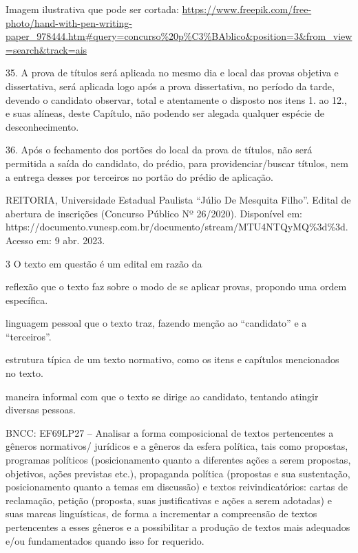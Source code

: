 \begin{escolha}
\begin{escolha}
\begin{escolha}
\begin{escolha}
\begin{escolha}
Imagem ilustrativa que pode ser cortada:
\url{https://www.freepik.com/free-photo/hand-with-pen-writing-paper_978444.htm\#query=concurso\%20p\%C3\%BAblico\&position=3\&from_view=search\&track=ais}

35. A prova de títulos será aplicada no mesmo dia e local das provas
objetiva e dissertativa, será aplicada logo após a prova dissertativa,
no período da tarde, devendo o candidato observar, total e atentamente o
disposto nos itens 1. ao 12., e suas alíneas, deste Capítulo, não
podendo ser alegada qualquer espécie de desconhecimento.

36. Após o fechamento dos portões do local da prova de títulos, não será
permitida a saída do candidato, do prédio, para providenciar/buscar
títulos, nem a entrega desses por terceiros no portão do prédio de
aplicação.

REITORIA, Universidade Estadual Paulista ``Júlio De Mesquita Filho''.
Edital de abertura de inscrições (Concurso Público Nº 26/2020).
Disponível em:
https://documento.vunesp.com.br/documento/stream/MTU4NTQyMQ\%3d\%3d.
Acesso em: 9 abr. 2023.

\num{3} O texto em questão é um edital em razão da

\begin{escolha}
\item reflexão que o texto faz sobre o modo de se aplicar provas, propondo
uma ordem específica.

\item linguagem pessoal que o texto traz, fazendo menção ao ``candidato''
e a ``terceiros''.

\item estrutura típica de um texto normativo, como os itens e capítulos
mencionados no texto.

\item maneira informal com que o texto se dirige ao candidato, tentando
atingir diversas pessoas.
\end{escolha}

BNCC: EF69LP27 -- Analisar a forma composicional de textos pertencentes
a gêneros normativos/ jurídicos e a gêneros da esfera política, tais
como propostas, programas políticos (posicionamento quanto a diferentes
ações a serem propostas, objetivos, ações previstas etc.), propaganda
política (propostas e sua sustentação, posicionamento quanto a temas em
discussão) e textos reivindicatórios: cartas de reclamação, petição
(proposta, suas justificativas e ações a serem adotadas) e suas marcas
linguísticas, de forma a incrementar a compreensão de textos
pertencentes a esses gêneros e a possibilitar a produção de textos mais
adequados e/ou fundamentados quando isso for requerido.


\end{escolha}
\end{escolha}
\end{escolha}
\end{escolha}
\end{escolha}
